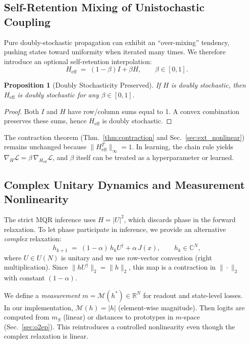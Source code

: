 \documentclass[11pt,a4paper]{article}
\newtheorem{proposition}[theorem]{Proposition}
\newcommand{\LL}{\mathcal{L}}
\begin{document}
\subsection{Self-Retention Mixing of Unistochastic Coupling}
\label{sec:ext_beta}

Pure doubly-stochastic propagation can exhibit an ``over-mixing'' tendency, pushing states toward uniformity when iterated many times. We therefore introduce an optional self-retention interpolation:
\begin{equation}
H_{\text{eff}} \;=\; (1-\beta)I + \beta H,\qquad \beta\in[0,1].
\end{equation}

\begin{proposition}[Doubly Stochasticity Preserved]
If $H$ is doubly stochastic, then $H_{\text{eff}}$ is doubly stochastic for any $\beta\in[0,1]$.
\end{proposition}

\begin{proof}
Both $I$ and $H$ have row/column sums equal to 1. A convex combination preserves these sums, hence $H_{\text{eff}}$ is doubly stochastic.
\end{proof}

The contraction theorem (Thm.~\ref{thm:contraction} and Sec.~\ref{sec:ext_nonlinear}) remains unchanged because $\|H_{\text{eff}}^T\|_\infty=1$. In learning, the chain rule yields $\nabla_H\LL = \beta\,\nabla_{H_{\text{eff}}}\LL$, and $\beta$ itself can be treated as a hyperparameter or learned.

\subsection{Complex Unitary Dynamics and Measurement Nonlinearity}
\label{sec:ext_unitary}

The strict MQR inference uses $H=|U|^2$, which discards phase in the forward relaxation. To let phase participate in inference, we provide an alternative \emph{complex} relaxation:
\begin{equation}
h_{k+1} \;=\; (1-\alpha)\,h_k U^\dagger + \alpha\,J(x), \qquad h_k\in\mathbb{C}^N,
\end{equation}
where $U\in U(N)$ is unitary and we use row-vector convention (right multiplication). Since $\|hU^\dagger\|_2=\|h\|_2$, this map is a contraction in $\|\cdot\|_2$ with constant $(1-\alpha)$.

We define a \emph{measurement} $m=\mathcal{M}(h^*)\in\mathbb{R}^N$ for readout and state-level losses. In our implementation, $\mathcal{M}(h)=|h|$ (element-wise magnitude). Then logits are computed from $m_S$ (linear) or distances to prototypes in $m$-space (Sec.~\ref{sec:o2ep}). This reintroduces a controlled nonlinearity even though the complex relaxation is linear.
\end{document}

